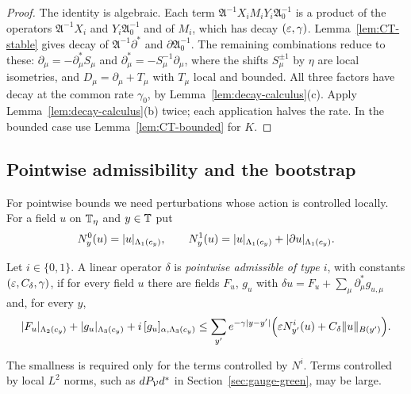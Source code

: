 \begin{proof}
The identity is algebraic. Each term $\mathfrak A^{-1}X_iM_iY_i\mathfrak A_0^{-1}$ is a product of the operators $\mathfrak A^{-1}X_i$ and $Y_i\mathfrak A_0^{-1}$ and of $M_i$, which has decay $(\varepsilon,\gamma)$. Lemma~\ref{lem:CT-stable} gives decay of $\mathfrak A^{-1}\partial^*$ and $\partial\mathfrak A_0^{-1}$. The remaining combinations reduce to these: $\partial_\mu=-\partial^*_\mu S_\mu$ and $\partial^*_\mu=-S_\mu^{-1}\partial_\mu$, where the shifts $S_\mu^{\pm1}$ by $\eta$ are local isometries, and $D_\mu=\partial_\mu+T_\mu$ with $T_\mu$ local and bounded. All three factors have decay at the common rate $\gamma_0$, by Lemma~\ref{lem:decay-calculus}(c). Apply Lemma~\ref{lem:decay-calculus}(b) twice; each application halves the rate. In the bounded case use Lemma~\ref{lem:CT-bounded} for $K$.
\end{proof}

\subsection{Pointwise admissibility and the bootstrap}\label{ss:13.3}

For pointwise bounds we need perturbations whose action is controlled locally. For a field $u$ on $\mathbb T_\eta$ and $y\in\mathbb T$ put
\[
N^0_y(u)=|u|_{\Lambda_1(c_y)},\qquad N^1_y(u)=|u|_{\Lambda_1(c_y)}+|\partial u|_{\Lambda_1(c_y)} .
\]

\begin{definition}\label{def:pointwise-admissible}
Let $i\in\{0,1\}$. A linear operator $\delta$ is \emph{pointwise admissible of type $i$}, with constants $(\varepsilon,C_\delta,\gamma)$, if for every field $u$ there are fields $F_u$, $g_u$ with $\delta u=F_u+\sum_\mu\partial^*_\mu g_{u,\mu}$ and, for every $y$,
\[
|F_u|_{\Lambda_2(c_y)}+|g_u|_{\Lambda_3(c_y)}+i\,[g_u]_{\alpha,\Lambda_3(c_y)}\le\sum_{y'}e^{-\gamma|y-y'|}\Big(\varepsilon N^i_{y'}(u)+C_\delta\|u\|_{B(y')}\Big).
\]
\end{definition}

The smallness is required only for the terms controlled by $N^i$. Terms controlled by local $L^2$ norms, such as $dP_\mathcal V d^*$ in Section~\ref{sec:gauge-green}, may be large.

